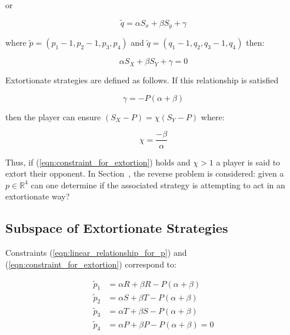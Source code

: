 \documentclass[a4paper]{article}
\begin{document}
or

\begin{equation}\label{eqn:linear_relationship_for_q}
    \tilde q=\alpha S_x + \beta S_y + \gamma
\end{equation}

where \(\tilde p = (p_1 - 1, p_2 - 1, p_3, p_4)\) and
\(\tilde q = (q_1 - 1, q_2, q_3 - 1, q_4)\) then:

\begin{equation}
    \alpha S_X + \beta S_Y + \gamma = 0
\end{equation}

Extortionate strategies are defined as follows. If this relationship is
satisfied

\begin{equation}\label{eqn:constraint_for_extortion}
    \gamma = - P(\alpha + \beta)
\end{equation}

then the player can ensure \((S_X - P)=\chi(S_Y-P)\) where:

\begin{equation}\label{eqn:definition_of_chi}
    \chi=\frac{-\beta}{\alpha}
\end{equation}

\noindent Thus, if (\ref{eqn:constraint_for_extortion}) holds and \(\chi >1\) a player is
said to extort their opponent.
In Section~\label{sec:subspace_of_extortionate_strategies}, the reverse problem is considered: given a
\(p\in\mathbb{R}^4\) can one determine if the associated strategy is attempting
to act in an extortionate way?

\subsection{Subspace of Extortionate Strategies}\label{sec:subspace_of_extortionate_strategies}

Constraints (\ref{eqn:linear_relationship_for_p}) and
(\ref{eqn:constraint_for_extortion}) correspond to:

\begin{align}
    \tilde p_1 & = \alpha R + \beta R - P (\alpha + \beta)
            \label{eqn:condition_for_tilde_p1}\\
    \tilde p_2 & = \alpha S + \beta T - P (\alpha + \beta)
            \label{eqn:condition_for_tilde_p2}\\
    \tilde p_3 & = \alpha T + \beta S - P (\alpha + \beta)
            \label{eqn:condition_for_tilde_p3}\\
    \tilde p_4 & = \alpha P + \beta P - P (\alpha + \beta) = 0
            \label{eqn:condition_for_tilde_p4}
\end{align}
\end{document}
